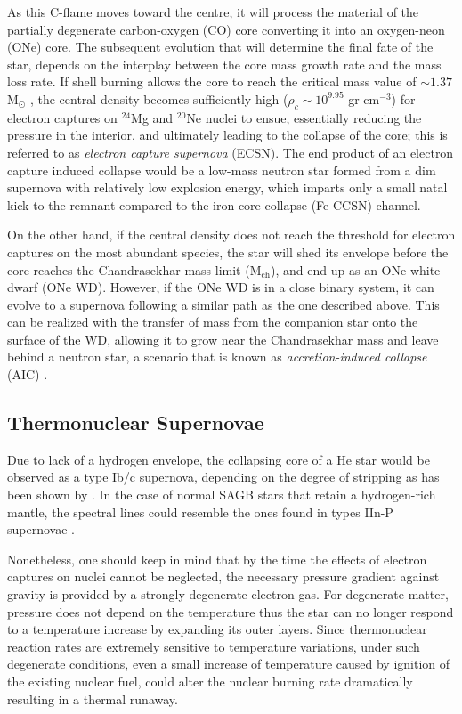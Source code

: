 \documentclass[../../main/thesis_msc.tex]{subfiles}
\begin{document}
As this C-flame moves toward the centre, it will process the material of the partially degenerate carbon-oxygen (CO) core converting it into an oxygen-neon (ONe) core. The subsequent evolution that will determine the final fate of the star, depends on the interplay between the core mass growth rate and the mass loss rate. If shell burning allows the core to reach the critical mass value of $\sim 1.37$ M$_{\odot}$ \citep{Nomoto1984}, the central density becomes sufficiently high ($\rho_c \sim 10^{9.95}$ gr cm$^{-3}$) for electron captures on $^{24}$Mg and $^{20}$Ne nuclei to ensue, essentially reducing the pressure in the interior, and ultimately leading to the collapse of the core; this is referred to as \textit{electron capture supernova} (ECSN).
The end product of an electron capture induced collapse would be a low-mass neutron star formed from a dim supernova \citep[e.g.][and references therein]{Fischer2010} with relatively low explosion energy, which imparts only a small natal kick to the remnant \citep{Knigge2011, Jones_2013, Jones2016} compared to the iron core collapse (Fe-CCSN) channel.

On the other hand, if the central density does not reach the threshold for electron captures on the most abundant species, the star will shed its envelope before the core reaches the Chandrasekhar mass limit (M$_{\text{ch}}$), and end up as an ONe white dwarf (ONe WD). However, if the ONe WD is in a close binary system, it can evolve to a supernova following a similar path as the one described above. This can be realized with the transfer of mass from the companion star onto the surface of the WD, allowing it to grow near the Chandrasekhar mass and leave behind a neutron star, a scenario that is known as \textit{accretion-induced collapse} (AIC) \citep[e.g.][]{nomoto1991, Schwab:2015bma, Brooks2017a, Schwab:2018cnb}.

\subsection{Thermonuclear Supernovae} \label{sec:thermonuclearSNe}
Due to lack of a hydrogen envelope, the collapsing core of a He star would be observed as a type Ib/c supernova, depending on the degree of stripping as has been shown by \cite{Tauris2013, Tauris2015}. In the case of normal SAGB stars that retain a hydrogen-rich mantle, the spectral lines could resemble the ones found in types IIn-P supernovae \citep[see][for details]{Moriya2014}.

Nonetheless, one should keep in mind that by the time the effects of electron captures on nuclei cannot be neglected, the necessary pressure gradient against gravity is provided by a strongly degenerate electron gas. For degenerate matter, pressure does not depend on the temperature thus the star can no longer respond to a temperature increase by expanding its outer layers. Since thermonuclear reaction rates are extremely sensitive to temperature variations, under such degenerate conditions, even a small increase of temperature caused by ignition of the existing nuclear fuel, could alter the nuclear burning rate dramatically resulting in a thermal runaway.
\end{document}
